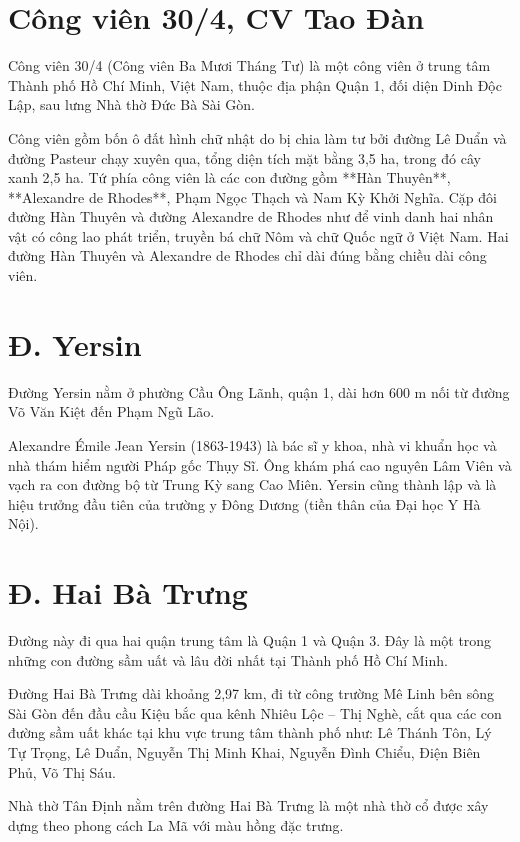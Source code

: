 \section{Công viên 30/4, CV Tao Đàn}

Công viên 30/4 (Công viên Ba Mươi Tháng Tư) là một công viên ở trung tâm Thành phố Hồ Chí Minh, Việt Nam, thuộc địa phận Quận 1, đối diện Dinh Độc Lập, sau lưng Nhà thờ Đức Bà Sài Gòn.

Công viên gồm bốn ô đất hình chữ nhật do bị chia làm tư bởi đường Lê Duẩn và đường Pasteur chạy xuyên qua, tổng diện tích mặt bằng 3,5 ha, trong đó cây xanh 2,5 ha. Tứ phía công viên là các con đường gồm **Hàn Thuyên**, **Alexandre de Rhodes**, Phạm Ngọc Thạch và Nam Kỳ Khởi Nghĩa. Cặp đôi đường Hàn Thuyên và đường Alexandre de Rhodes như để vinh danh hai nhân vật có công lao phát triển, truyền bá chữ Nôm và chữ Quốc ngữ ở Việt Nam. Hai đường Hàn Thuyên và Alexandre de Rhodes chỉ dài đúng bằng chiều dài công viên.

\section{Đ. Yersin}

Đường Yersin nằm ở phường Cầu Ông Lãnh, quận 1, dài hơn 600 m nối từ đường Võ Văn Kiệt đến Phạm Ngũ Lão.

Alexandre Émile Jean Yersin (1863-1943) là bác sĩ y khoa, nhà vi khuẩn học và nhà thám hiểm người Pháp gốc Thụy Sĩ. Ông khám phá cao nguyên Lâm Viên và vạch ra con đường bộ từ Trung Kỳ sang Cao Miên. Yersin cũng thành lập và là hiệu trưởng đầu tiên của trường y Đông Dương (tiền thân của Đại học Y Hà Nội).

\section{Đ. Hai Bà Trưng}

Đường này đi qua hai quận trung tâm là Quận 1 và Quận 3. Đây là một trong những con đường sầm uất và lâu đời nhất tại Thành phố Hồ Chí Minh.

Đường Hai Bà Trưng dài khoảng 2,97 km, đi từ công trường Mê Linh bên sông Sài Gòn đến đầu cầu Kiệu bắc qua kênh Nhiêu Lộc – Thị Nghè, cắt qua các con đường sầm uất khác tại khu vực trung tâm thành phố như: Lê Thánh Tôn, Lý Tự Trọng, Lê Duẩn, Nguyễn Thị Minh Khai, Nguyễn Đình Chiểu, Điện Biên Phủ, Võ Thị Sáu.

Nhà thờ Tân Định nằm trên đường Hai Bà Trưng là một nhà thờ cổ được xây dựng theo phong cách La Mã với màu hồng đặc trưng.

